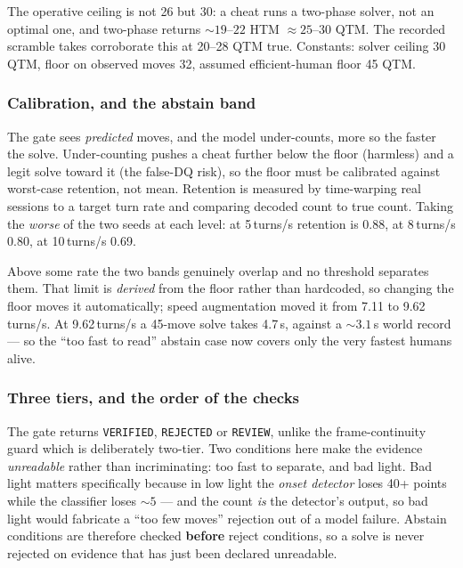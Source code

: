 The operative ceiling is not 26 but 30: a cheat runs a two-phase solver, not
an optimal one, and two-phase returns ${\sim}19$--$22$ HTM $\approx 25$--$30$
QTM. The recorded scramble takes corroborate this at 20--28 QTM true.
Constants: solver ceiling 30 QTM, floor on observed moves 32, assumed
efficient-human floor 45 QTM.

\subsubsection{Calibration, and the abstain band}

The gate sees \emph{predicted} moves, and the model under-counts, more so the
faster the solve. Under-counting pushes a cheat further below the floor
(harmless) and a legit solve toward it (the false-DQ risk), so the floor must
be calibrated against worst-case retention, not mean. Retention is measured
by time-warping real sessions to a target turn rate and comparing decoded
count to true count. Taking the \emph{worse} of the two seeds at each level:
at 5\,turns/s retention is 0.88, at 8\,turns/s 0.80, at 10\,turns/s 0.69.

Above some rate the two bands genuinely overlap and no threshold separates
them. That limit is \emph{derived} from the floor rather than hardcoded, so
changing the floor moves it automatically; speed augmentation moved it from
7.11 to 9.62\,turns/s. At 9.62\,turns/s a 45-move solve takes 4.7\,s, against
a ${\sim}3.1$\,s world record --- so the ``too fast to read'' abstain case now
covers only the very fastest humans alive.

\subsubsection{Three tiers, and the order of the checks}

The gate returns \texttt{VERIFIED}, \texttt{REJECTED} or \texttt{REVIEW},
unlike the frame-continuity guard which is deliberately two-tier. Two
conditions here make the evidence \emph{unreadable} rather than
incriminating: too fast to separate, and bad light. Bad light matters
specifically because in low light the \emph{onset detector} loses 40+ points
while the classifier loses ${\sim}5$ --- and the count \emph{is} the
detector's output, so bad light would fabricate a ``too few moves'' rejection
out of a model failure. Abstain conditions are therefore checked
\textbf{before} reject conditions, so a solve is never rejected on evidence
that has just been declared unreadable.


